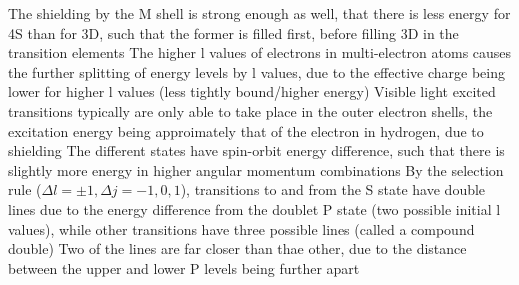 \documentclass[11 pt, twoside]{article}
\newenvironment{outline*}
{
	\begin{outline}[enumerate]
	}
	{\end{outline}
}
\begin{document}
\begin{outline*}
	\2 The shielding by the M shell is strong enough as well, that there is less energy for 4S than for 3D, such that the former is filled first, before filling 3D in the transition elements
	\2 The higher l values of electrons in multi-electron atoms causes the further splitting of energy levels by l values, due to the effective charge being lower for higher l values (less tightly bound/higher energy)
\1 Visible light excited transitions typically are only able to take place in the outer electron shells, the excitation energy being approimately that of the electron in hydrogen, due to shielding
	\2 The different states have spin-orbit energy difference, such that there is slightly more energy in higher angular momentum combinations
	\2 By the selection rule ($\Delta l = \pm 1, \Delta j = -1, 0, 1$), transitions to and from the S state have double lines due to the energy difference from the doublet P state (two possible initial l values), while other transitions have three possible lines (called a compound double)
		\3 Two of the lines are far closer than thae other, due to the distance between the upper and lower P levels being further apart
\end{outline*}
\end{document}
